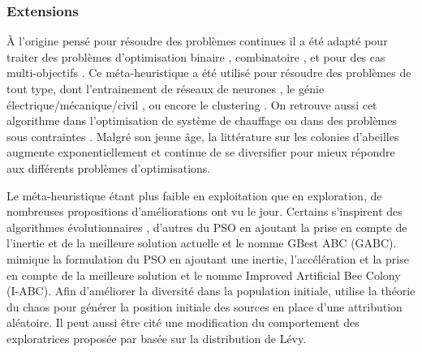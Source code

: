 \subsubsection{Extensions} %
\label{ssub:extensions}
À l’origine pensé pour résoudre des problèmes continues il a été adapté pour traiter des problèmes
d’optimisation binaire \cite{Kashan2012342}, combinatoire \cite{Karaboga20113021}, et pour des cas multi-objectifs
\cite{Akbari201239,Omkar2011489}.
Ce méta-heuristique a été utilisé pour résoudre des problèmes de tout type, dont l’entrainement de réseaux de
neurones \parencite{Karaboga2007}, le génie électrique/mécanique/civil \parencite{Rao2009887}, ou encore le clustering \parencite{Zhang20104761}.
On retrouve aussi cet algorithme dans l’optimisation de système de chauffage \parencite{Atashkari2011} ou dans des problèmes sous
contraintes \parencite{Tsai201480,Karaboga20113021}.
Malgré son jeune âge, la littérature sur les colonies d’abeilles augmente exponentiellement et continue de se diversifier
pour mieux répondre aux différents problèmes d’optimisations.

Le méta-heuristique étant plus faible en exploitation que en exploration, de nombreuses
propositions d’améliorations ont vu le jour.
Certains s’inspirent des algorithmes évolutionnaires \parencite{Bi2011174,Zhao2010558},
d’autres du PSO \parencite{Zhu20103166} en ajoutant la prise en compte de l’inertie
et de la meilleure solution actuelle et le nomme GBest ABC (GABC). \cite{Li2012320}
mimique la formulation du PSO en ajoutant une inertie, l’accélération et la prise
en compte de la meilleure solution et le nomme Improved Artificial Bee Colony (I-ABC).
Afin d’améliorer la diversité dans la population initiale, \cite{Xiang20131256}
utilise la théorie du chaos pour générer la position initiale des sources en place
d’une attribution aléatoire. Il peut aussi être cité une modification du comportement
des exploratrices proposée par \cite{Sharma2012213} basée sur la distribution de
Lévy.

